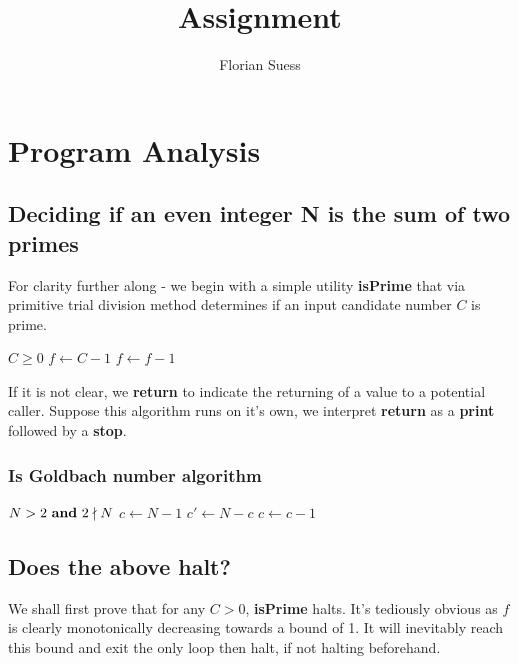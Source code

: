 \documentclass{article}
\title{Assignment}
\author{Florian Suess}
\begin{document}
\maketitle
\section{Program Analysis}
\subsection{Deciding if an even integer N is the sum of two primes}
For clarity further along - we begin with a simple utility \textbf{isPrime} that via primitive trial division method determines if an input candidate number $C$ is prime.

\begin{algorithmic}[1]
	\REQUIRE $C \geq 0$
	\ENDIF
	\STATE $f \leftarrow C - 1$
		\ENDIF
		\STATE $f \leftarrow f - 1$
	\ENDWHILE
\end{algorithmic}

If it is not clear, we \textbf{return} to indicate the returning of a value to a potential caller. Suppose this algorithm runs on it's own, we interpret \textbf{return} as a \textbf{print} followed by a \textbf{stop}.

\pagebreak

\subsubsection*{Is Goldbach number algorithm}
\begin{algorithmic}[1]
	\REQUIRE $N > 2 \text{ \textbf{and} } 2 \nmid N$
	\STATE $c \leftarrow N - 1$
			\STATE $c' \leftarrow N - c$
			\ENDIF
		\ENDIF
		\STATE $c \leftarrow c - 1$
	\ENDWHILE
\end{algorithmic}


\subsection{Does the above halt?}
We shall first prove that for any $C > 0$, \textbf{isPrime} halts. It's tediously obvious as $f$ is clearly monotonically decreasing towards a bound of 1. It will inevitably reach this bound and exit the only loop then halt, if not halting beforehand.
\end{document}
